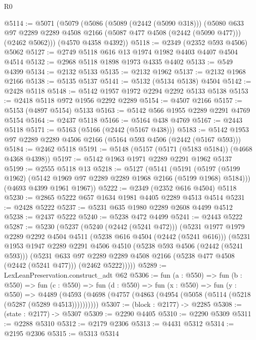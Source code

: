 \begin{lexlean}{R0}
\begin{coremodule}
@5114 := @5071
    (@5079
      (@5086
        (@5089 (@2442 (@5090 @318)))
        (@5080
          @633
          @97
          @2289
          @2289
          @4508
          @2166
          (@5087 @477 @4508 (@2442 (@5090 @477)))
          (@2462 @5062)))
      (@4570 @4358 @4392))
@5118 := @2349 (@2352 @593 @4506) @5062
@5127 := @2749 @5118 @616 @13 @1974 @1982 @4403 @4407 @4504 @4514
@5132 := @2968 @5118 @1898 @1973 @4335 @4402
@5133 := @549 @4399
@5134 := @2132 @5133
@5135 := @2132 @1962
@5137 := @2132 @1968 @2166
@5138 := @5135 @5137
@5141 := @5132 (@5134 @5138) @4504
@5142 := @2428 @5118
@5148 := @5142 @1957 @1972 @2294 @2292 @5133 @5138
@5153 := @2418 @5118 @972 @1956 @2292 @2289
@5154 := @4507 @2166
@5157 := @5153 (@4897 @5154) @5133
@5163 := @5142 @566 @1955 @2289 @2291 @4769 @5154
@5164 := @2437 @5118
@5166 := @5164 @438 @4769
@5167 := @2443 @5118
@5171 := @5163 (@5166 (@2442 (@5167 @438)))
@5183 := @5142 @1953 @97 @2289 @2289 @4506 @2166 (@5164 @593 @4506 (@2442 (@5167 @593)))
@5184 := @2462 @5118
@5191 := @5148 (@5157 (@5171 (@5183 @5184)) (@4668 @4368 @4398))
@5197 := @5142 @1963 @1971 @2289 @2291 @1962 @5137
@5199 := @2555 @5118 @13
@5218 := @5127
    (@5141
      (@5191 (@5197 (@5199 @1962) (@5142 @1969 @97 @2289 @2289 @1968 @2166 (@5199 @1968) @5184)))
      (@4693 @4399 @1961 @1967))
@5222 := @2349 (@2352 @616 @4504) @5118
@5230 := @2865 @5222 @657 @1634 @1981 @4405 @2289 @4513 @4514
@5231 := @2428 @5222
@5237 := @5231 @635 @1980 @2289 @2608 @4499 @4512
@5238 := @2437 @5222
@5240 := @5238 @472 @4499
@5241 := @2443 @5222
@5287 := @5230
    (@5237
      (@5240 (@2442 (@5241 @472)))
      (@5231
        @1977
        @1979
        @2289
        @2292
        @4504
        @4511
        (@5238 @616 @4504 (@2442 (@5241 @616)))
        (@5231
          @1953
          @1947
          @2289
          @2291
          @4506
          @4510
          (@5238 @593 @4506 (@2442 (@5241 @593)))
          (@5231
            @633
            @97
            @2289
            @2289
            @4508
            @2166
            (@5238 @477 @4508 (@2442 (@5241 @477)))
            (@2462 @5222)))))
@5289 := LexLeanPreservation.construct_adt @62
@5306 := fun (a : @550) =>
  fun (b : @550) =>
  fun (c : @550) =>
  fun (d : @550) =>
  fun (x : @550) =>
  fun (y : @550) =>
  @4489 (@4593 (@4698 (@4757 (@4863 (@4954 (@5058 (@5114 (@5218 (@5287 (@5289 @4513))))))))))
@5307 := (block : @2177) -> @2285
@5308 := (state : @2177) -> @5307
@5309 := @2290 @4405
@5310 := @2290 @5309
@5311 := @2288 @5310
@5312 := @2179 @2306
@5313 := @4431 @5312
@5314 := @2195 @2306
@5315 := @5313 @5314

\end{coremodule}
\end{lexlean}
